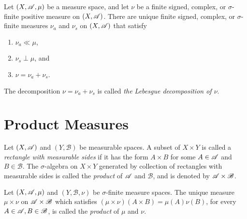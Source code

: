 \documentclass[12pt]{article}
\begin{document}
\begin{definition}
    Let $(X,\mathscr{A},\mu)$ be a measure space, and let $\nu$ be a finite signed, complex, or $\sigma$-finite positive measure on $(X,\mathscr{A})$. There are unique finite signed, complex, or $\sigma$-finite measures $\nu_a$ and $\nu_s$ on $(X,\mathscr{A})$ that satisfy
    \begin{enumerate}[label=(\alph*)]
        \item $\nu_a\ll\mu$,
        \item $\nu_s\perp\mu$, and
        \item $\nu=\nu_a+\nu_s$.
    \end{enumerate}
    The decomposition $\nu=\nu_a+\nu_s$ is called \textit{the Lebesgue decomposition of $\nu$}.
\end{definition}
\newpage
\section{Product Measures}
\begin{definition}
    Let $(X,\mathscr{A})$ and $(Y,\mathscr{B})$ be measurable spaces. A subset of $X\times Y$ is called a \textit{rectangle with measurable sides} if it has the form $A\times B$ for some $A\in\mathscr{A}$ and $B\in\mathscr{B}$. The $\sigma$-algebra on $X\times Y$ generated by collection of rectangles with measurable sides is called the \textit{product} of $\mathscr{A}$ and $\mathscr{B}$, and is denoted by $\mathscr{A}\times \mathscr{B}$.
\end{definition}
\begin{definition}
    Let $(X,\mathscr{A},\mu)$ and $(Y,\mathscr{B},\nu)$ be $\sigma$-finite measure spaces. The unique measure $\mu\times\nu$ on $\mathscr{A}\times\mathscr{B}$ which satisfies $(\mu\times\nu)(A\times B)=\mu(A)\nu(B)$, for every $A\in\mathscr{A},B\in\mathscr{B}$, is called the \textit{product} of $\mu$ and $\nu$.
\end{definition}
\newpage
\setcounter{section}{9}
\end{document}
